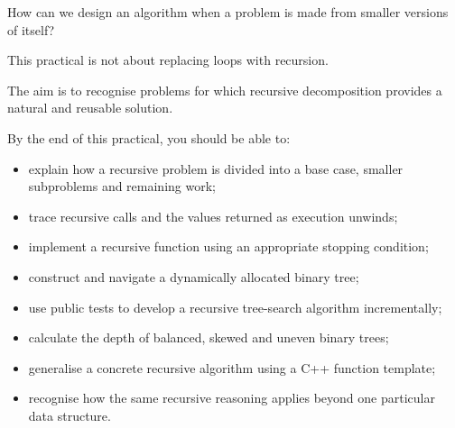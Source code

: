 \documentclass{csc2059practical}
\begin{document}
\begin{engineeringquestion}
How can we design an algorithm when a problem is made from smaller versions of
itself?
\end{engineeringquestion}

\begin{importantnote}
This practical is not about replacing loops with recursion.

The aim is to recognise problems for which recursive decomposition provides a
natural and reusable solution.
\end{importantnote}


\begin{learningoutcomes}

By the end of this practical, you should be able to:

\begin{itemize}
    \item explain how a recursive problem is divided into a base case, smaller
          subproblems and remaining work;
    \item trace recursive calls and the values returned as execution unwinds;
    \item implement a recursive function using an appropriate stopping
          condition;
    \item construct and navigate a dynamically allocated binary tree;
    \item use public tests to develop a recursive tree-search algorithm
          incrementally;
    \item calculate the depth of balanced, skewed and uneven binary trees;
    \item generalise a concrete recursive algorithm using a C++ function
          template;
    \item recognise how the same recursive reasoning applies beyond one
          particular data structure.
\end{itemize}

\end{learningoutcomes}

\end{document}
